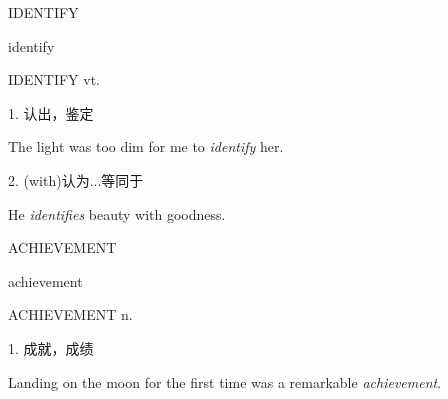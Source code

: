 \begin{flashcard}{
IDENTIFY

identify
}
\begin{center}
IDENTIFY vt. 
\end{center}
1. 认出，鉴定

The light was too dim for me to \textit{identify} her.

2. (with)认为...等同于

He \textit{identifies} beauty with goodness.

\end{flashcard}
\begin{flashcard}{
ACHIEVEMENT

achievement
}
\begin{center}
ACHIEVEMENT n. 
\end{center}
1. 成就，成绩

Landing on the moon for the first time was a remarkable \textit{achievement}.

\end{flashcard}
